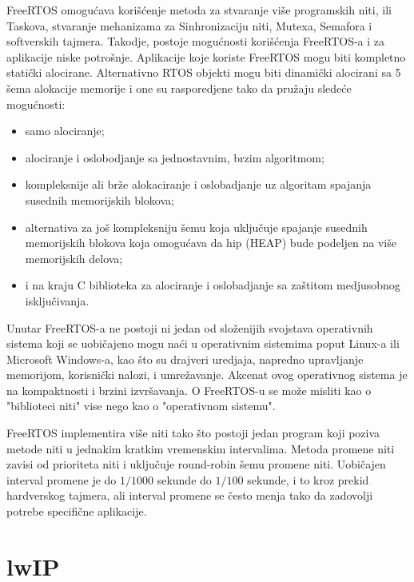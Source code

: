 \documentclass[a4paper,12pt, master]{etf}
\begin{document}
	FreeRTOS omogu\'{c}ava kori\v{s}\'{c}enje metoda za stvaranje vi\v{s}e programskih niti,
	ili Taskova, stvaranje mehanizama za Sinhronizaciju niti, Mutexa, Semafora i softverskih tajmera.
	Takodje, postoje mogu\'{c}nosti kori\v{s}\'{c}enja FreeRTOS-a i za aplikacije niske potro\v{s}nje.
	Aplikacije koje koriste FreeRTOS mogu biti kompletno stati\v{c}ki alocirane. Alternativno
	RTOS objekti mogu biti dinami\v{c}ki alocirani sa 5 \v{s}ema alokacije memorije i one su rasporedjene
	tako da pru\v{z}aju slede\'{c}e mogu\'{c}nosti:

	\begin{itemize}
		\item samo alociranje;
		\item alociranje i oslobodjanje sa jednostavnim, brzim algoritmom;
		\item kompleksnije ali br\v{z}e alokaciranje i oslobadjanje uz algoritam spajanja susednih
		memorijskih blokova;
		\item alternativa za jo\v{s} kompleksniju \v{s}emu koja uklju\v{c}uje spajanje susednih
		memorijskih	blokova	koja omogu\'{c}ava da hip (HEAP) bude podeljen na vi\v{s}e memorijskih
		delova;
		\item i na kraju C biblioteka za alociranje i oslobadjanje sa za\v{s}titom medjusobnog
		isklju\v{c}ivanja.
	\end{itemize}

	Unutar FreeRTOS-a ne postoji ni jedan od slo\v{z}enijih svojstava operativnih sistema koji se
	uobi\v{c}ajeno mogu na\'{c}i u operativnim sistemima poput Linux-a ili Microsoft Windows-a, kao
	\v{s}to su drajveri uredjaja, napredno upravljanje memorijom, korisni\v{c}ki nalozi, i
	umre\v{z}avanje. Akcenat ovog operativnog sistema je na kompaktnosti i brzini izvr\v{s}avanja. O
	FreeRTOS-u se mo\v{z}e misliti kao o "biblioteci niti" vise nego kao o "operativnom sistemu".

	FreeRTOS implementira vi\v{s}e niti tako \v{s}to postoji jedan program koji poziva metode niti u
	jednakim kratkim vremenskim intervalima. Metoda promene niti zavisi od prioriteta niti i
	uklju\v{c}uje round-robin \v{s}emu promene niti. Uobi\v{c}ajen interval promene je do $1/1000$ sekunde
	do $1/100$ sekunde, i to kroz prekid hardverskog tajmera, ali interval promene se \v{c}esto menja
	tako da zadovolji potrebe specifi\v{c}ne aplikacije.

	\section{lwIP}
\end{document}
